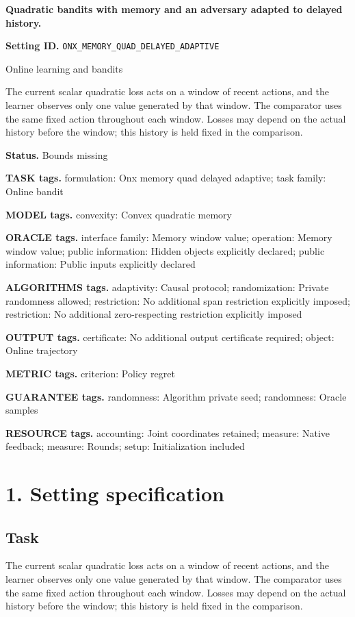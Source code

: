 \documentclass[10pt,a4paper]{article}
\begin{document}
\raggedright

{\LARGE\bfseries\sffamily\color{AtlasNavy} Quadratic bandits with memory and an adversary adapted to delayed history.\par}\vspace{5pt}
\textbf{Setting ID.} \texttt{ONX\_\allowbreak{}MEMORY\_\allowbreak{}QUAD\_\allowbreak{}DELAYED\_\allowbreak{}ADAPTIVE}

Online learning and bandits

The current scalar quadratic loss acts on a window of recent actions, and the learner observes only one value generated by that window. The comparator uses the same fixed action throughout each window. Losses may depend on the actual history before the window; this history is held fixed in the comparison.

\textbf{Status.} Bounds missing

\textbf{TASK tags.} formulation: Onx memory quad delayed adaptive; task family: Online bandit

\textbf{MODEL tags.} convexity: Convex quadratic memory

\textbf{ORACLE tags.} interface family: Memory window value; operation: Memory window value; public information: Hidden objects explicitly declared; public information: Public inputs explicitly declared

\textbf{ALGORITHMS tags.} adaptivity: Causal protocol; randomization: Private randomness allowed; restriction: No additional span restriction explicitly imposed; restriction: No additional zero-respecting restriction explicitly imposed

\textbf{OUTPUT tags.} certificate: No additional output certificate required; object: Online trajectory

\textbf{METRIC tags.} criterion: Policy regret

\textbf{GUARANTEE tags.} randomness: Algorithm private seed; randomness: Oracle samples

\textbf{RESOURCE tags.} accounting: Joint coordinates retained; measure: Native feedback; measure: Rounds; setup: Initialization included

\section{1. Setting specification}
\subsection{Task}
The current scalar quadratic loss acts on a window of recent actions, and the learner observes only one value generated by that window. The comparator uses the same fixed action throughout each window. Losses may depend on the actual history before the window; this history is held fixed in the comparison.
\end{document}

